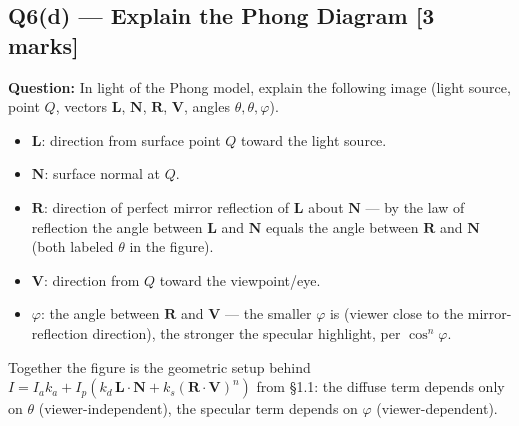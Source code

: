\documentclass[12pt, a4paper]{article}
\newenvironment{solutionbox}{\begin{mdframed}[style=solutionframe]}{\end{mdframed}}
\newenvironment{answerbox}{\begin{mdframed}[style=answerframe]}{\end{mdframed}}
\begin{document}
\subsection*{Q6(d) --- Explain the Phong Diagram [3 marks]}
\begin{solutionbox}
\textbf{Question:} In light of the Phong model, explain the following image (light source, point $Q$, vectors $\mathbf{L}$, $\mathbf{N}$, $\mathbf{R}$, $\mathbf{V}$, angles $\theta,\theta,\varphi$).
\end{solutionbox}
\begin{answerbox}
\begin{itemize}[noitemsep]
  \item $\mathbf{L}$: direction from surface point $Q$ toward the light source.
  \item $\mathbf{N}$: surface normal at $Q$.
  \item $\mathbf{R}$: direction of perfect mirror reflection of $\mathbf{L}$ about $\mathbf{N}$ — by the law of reflection the angle between $\mathbf{L}$ and $\mathbf{N}$ equals the angle between $\mathbf{R}$ and $\mathbf{N}$ (both labeled $\theta$ in the figure).
  \item $\mathbf{V}$: direction from $Q$ toward the viewpoint/eye.
  \item $\varphi$: the angle between $\mathbf{R}$ and $\mathbf{V}$ — the smaller $\varphi$ is (viewer close to the mirror-reflection direction), the stronger the specular highlight, per $\cos^n\varphi$.
\end{itemize}
Together the figure is the geometric setup behind $I=I_ak_a+I_p(k_d\,\mathbf{L}\!\cdot\!\mathbf{N}+k_s(\mathbf{R}\!\cdot\!\mathbf{V})^n)$ from \S1.1: the diffuse term depends only on $\theta$ (viewer-independent), the specular term depends on $\varphi$ (viewer-dependent).
\end{answerbox}
\end{document}
